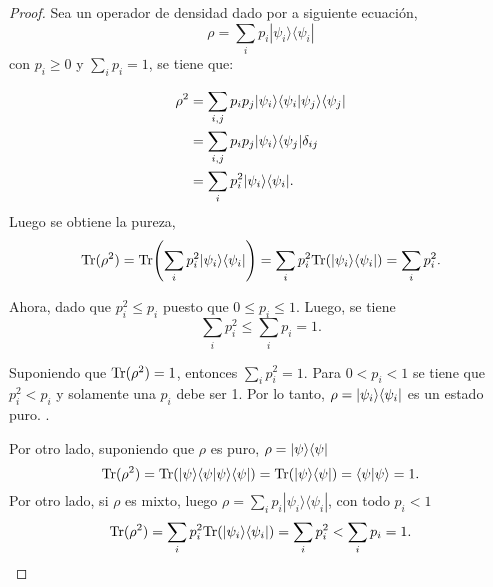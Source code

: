 \begin{proof}
	Sea un operador de densidad dado por a siguiente ecuación, \[\rho=\sum_i p_i |\psi_i\rangle \langle \psi_i|\] con $p_i\ge 0$ y $\sum_{i}p_i=1$, se tiene que:
	
	\begin{equation*}
		\begin{split}
			\rho^2&=\sum_{i,j} p_i p_j|\psi_i\rangle \langle \psi_i|\psi_j\rangle \langle \psi_j|\\
			&=\sum_{i,j} p_i p_j|\psi_i \rangle \langle \psi_j|\delta_{ij}\\
			&=\sum_i p_i^2|\psi_i \rangle \langle \psi_i|.
			\end{split}
	\end{equation*}
	Luego se obtiene la pureza, \[{\rm Tr}(\rho^2)={\rm Tr}{\left(\sum_i p_i^2|\psi_i \rangle \langle \psi_i|\right)}=\sum_i p_i^2 {\rm Tr}(|\psi_i \rangle \langle\psi_i|)=\sum_i p_i^2.\]
	
	Ahora, dado que $p_i^2 \le p_i $ puesto que $0 \le p_i \le 1$. Luego, se tiene \[\sum_i p_i^2\le\sum_i p_i=1.\]
	
	Suponiendo que ${\rm Tr}(\rho^2)=1$, entonces $\sum_i p_i^{2}=1$. Para $0<p_i<1$ se tiene que  $p_i^2<p_i$ y solamente una $p_i$ debe ser 1. Por lo tanto, $\rho=|\psi_i\rangle \langle\psi_i|$ es un estado puro.
	  .  
    
     
   Por otro lado, suponiendo que $\rho
$ es puro, $\rho=|\psi\rangle \langle \psi|$
\[{\rm Tr}(\rho^2)={\rm Tr}(|\psi\rangle \langle \psi|\psi\rangle \langle \psi|)={\rm Tr}(|\psi\rangle \langle
\psi|)=\langle\psi|\psi\rangle=1.\]
  Por otro lado, si $\rho $ es mixto, luego $\rho=\sum_i
p_i|\psi_i\rangle \langle \psi_i|$, con todo $p_i<1$ \[{\rm Tr}(\rho^2)=\sum_i p_i^2
{\rm Tr}(|\psi_i \rangle \langle\psi_i|)=\sum_i p_i^2<\sum_i p_i=1.\]
	\end{proof}



